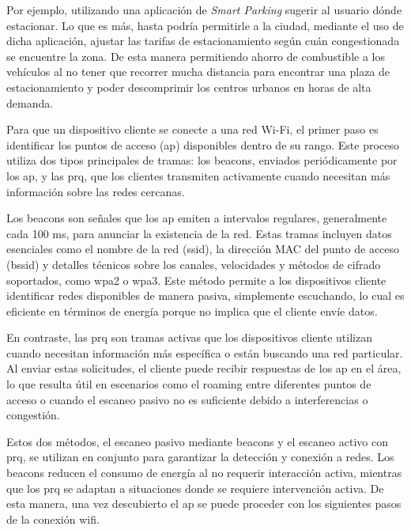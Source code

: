 Por ejemplo, utilizando una aplicación de \textit{Smart Parking} sugerir al usuario dónde estacionar. Lo que es más, hasta podría permitirle a la ciudad, mediante el uso de dicha aplicación, ajustar las tarifas de estacionamiento según cuán congestionada se encuentre la zona. De esta manera permitiendo ahorro de combustible a los vehículos al no tener que recorrer mucha distancia para encontrar una plaza de estacionamiento y poder descomprimir los centros urbanos en horas de alta demanda.

Para que un dispositivo cliente se conecte a una red Wi-Fi, el primer paso es identificar los puntos de acceso (\acs{ap}) disponibles dentro de su rango. Este proceso utiliza dos tipos principales de tramas: los \acl{beacons}, enviados periódicamente por los \acs{ap}, y las \acl{prq}, que los clientes transmiten activamente cuando necesitan más información sobre las redes cercanas.

Los \acs{beacons} son señales que los \acs{ap} emiten a intervalos regulares, generalmente cada 100 ms, para anunciar la existencia de la red. Estas tramas incluyen datos esenciales como el nombre de la red (\acs{ssid}), la dirección MAC del punto de acceso (\acs{bssid}) y detalles técnicos sobre los canales, velocidades y métodos de cifrado soportados, como \acs{wpa2} o \acs{wpa3}. Este método permite a los dispositivos cliente identificar redes disponibles de manera pasiva, simplemente escuchando, lo cual es eficiente en términos de energía porque no implica que el cliente envíe datos.

En contraste, las \acl{prq} son tramas activas que los dispositivos cliente utilizan cuando necesitan información más específica o están buscando una red particular. Al enviar estas solicitudes, el cliente puede recibir respuestas de los \acs{ap} en el área, lo que resulta útil en escenarios como el roaming entre diferentes puntos de acceso o cuando el escaneo pasivo no es suficiente debido a interferencias o congestión.

Estos dos métodos, el escaneo pasivo mediante \acl{beacons} y el escaneo activo con \acl{prq}, se utilizan en conjunto para garantizar la detección y conexión a redes. Los \acl{beacons} reducen el consumo de energía al no requerir interacción activa, mientras que los \acl{prq} se adaptan a situaciones donde se requiere intervención activa. De esta manera, una vez descubierto el \acs{ap} se puede proceder con los siguientes pasos de la conexión wifi.



